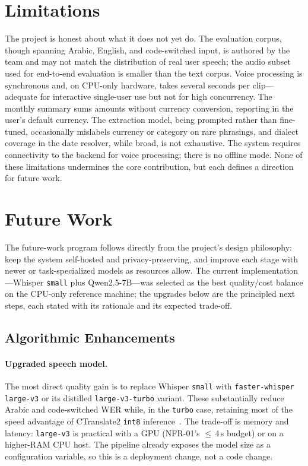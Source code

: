 \section{Limitations}

The project is honest about what it does not yet do. The evaluation corpus,
though spanning Arabic, English, and code-switched input, is authored by the team
and may not match the distribution of real user speech; the audio subset used for
end-to-end evaluation is smaller than the text corpus. Voice processing is
synchronous and, on CPU-only hardware, takes several seconds per clip---adequate
for interactive single-user use but not for high concurrency. The monthly summary
sums amounts without currency conversion, reporting in the user's default
currency. The extraction model, being prompted rather than fine-tuned, occasionally
mislabels currency or category on rare phrasings, and dialect coverage in the
date resolver, while broad, is not exhaustive. The system requires connectivity to
the backend for voice processing; there is no offline mode. None of these
limitations undermines the core contribution, but each defines a direction for
future work.

\section{Future Work}

The future-work program follows directly from the project's design philosophy:
keep the system self-hosted and privacy-preserving, and improve each stage with
newer or task-specialized models as resources allow. The current
implementation---Whisper \texttt{small} plus Qwen2.5-7B---was selected as the best
quality/cost balance on the CPU-only reference machine; the upgrades below are the
principled next steps, each stated with its rationale and its expected trade-off.

\subsection{Algorithmic Enhancements}

\paragraph{Upgraded speech model.} The most direct quality gain is to replace
Whisper \texttt{small} with \texttt{faster-whisper large-v3} or its distilled
\texttt{large-v3-turbo} variant. These substantially reduce Arabic and
code-switched WER while, in the \texttt{turbo} case, retaining most of the speed
advantage of CTranslate2 \texttt{int8} inference~\cite{fasterwhisper,ctranslate2}.
The trade-off is memory and latency: \texttt{large-v3} is practical with a GPU
(NFR-01's $\leq$\,4\,s budget) or on a higher-RAM CPU host. The pipeline already
exposes the model size as a configuration variable, so this is a deployment
change, not a code change.

